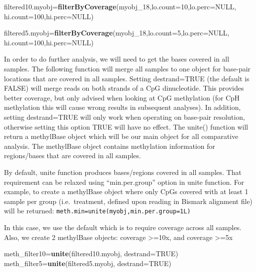 \documentclass[]{article}
\newenvironment{Shaded}{\begin{snugshade}}{\end{snugshade}}
\newcommand{\KeywordTok}[1]{\textcolor[rgb]{0.13,0.29,0.53}{\textbf{#1}}}
\newcommand{\DataTypeTok}[1]{\textcolor[rgb]{0.13,0.29,0.53}{#1}}
\newcommand{\DecValTok}[1]{\textcolor[rgb]{0.00,0.00,0.81}{#1}}
\newcommand{\OtherTok}[1]{\textcolor[rgb]{0.56,0.35,0.01}{#1}}
\newcommand{\NormalTok}[1]{#1}
\begin{document}
\begin{Shaded}
\begin{Highlighting}[]
\NormalTok{filtered10.myobj=}\KeywordTok{filterByCoverage}\NormalTok{(myobj_}\DecValTok{18}\NormalTok{,}\DataTypeTok{lo.count=}\DecValTok{10}\NormalTok{,}\DataTypeTok{lo.perc=}\OtherTok{NULL}\NormalTok{,}
                                      \DataTypeTok{hi.count=}\DecValTok{100}\NormalTok{,}\DataTypeTok{hi.perc=}\OtherTok{NULL}\NormalTok{)}

\NormalTok{filtered5.myobj=}\KeywordTok{filterByCoverage}\NormalTok{(myobj_}\DecValTok{18}\NormalTok{,}\DataTypeTok{lo.count=}\DecValTok{5}\NormalTok{,}\DataTypeTok{lo.perc=}\OtherTok{NULL}\NormalTok{,}
                                      \DataTypeTok{hi.count=}\DecValTok{100}\NormalTok{,}\DataTypeTok{hi.perc=}\OtherTok{NULL}\NormalTok{)}
\end{Highlighting}
\end{Shaded}

In order to do further analysis, we will need to get the bases covered
in all samples. The following function will merge all samples to one
object for base-pair locations that are covered in all samples. Setting
destrand=TRUE (the default is FALSE) will merge reads on both strands of
a CpG dinucleotide. This provides better coverage, but only advised when
looking at CpG methylation (for CpH methylation this will cause wrong
results in subsequent analyses). In addition, setting destrand=TRUE will
only work when operating on base-pair resolution, otherwise setting this
option TRUE will have no effect. The unite() function will return a
methylBase object which will be our main object for all comparative
analysis. The methylBase object contains methylation information for
regions/bases that are covered in all samples.

By default, unite function produces bases/regions covered in all
samples. That requirement can be relaxed using ``min.per.group'' option
in unite function. For example, to create a methylBase object where only
CpGs covered with at least 1 sample per group (i.e.~treatment, defined
upon reading in Bismark alignment file) will be returned:
\texttt{meth.min=unite(myobj,min.per.group=1L)}

In this case, we use the default which is to require coverage across all
samples. Also, we create 2 methylBase objects: coverage
\textgreater{}=10x, and coverage \textgreater{}=5x

\begin{Shaded}
\begin{Highlighting}[]
\NormalTok{meth_filter10=}\KeywordTok{unite}\NormalTok{(filtered10.myobj, }\DataTypeTok{destrand=}\OtherTok{TRUE}\NormalTok{)}
\NormalTok{meth_filter5=}\KeywordTok{unite}\NormalTok{(filtered5.myobj, }\DataTypeTok{destrand=}\OtherTok{TRUE}\NormalTok{)}
\end{Highlighting}
\end{Shaded}
\end{document}
